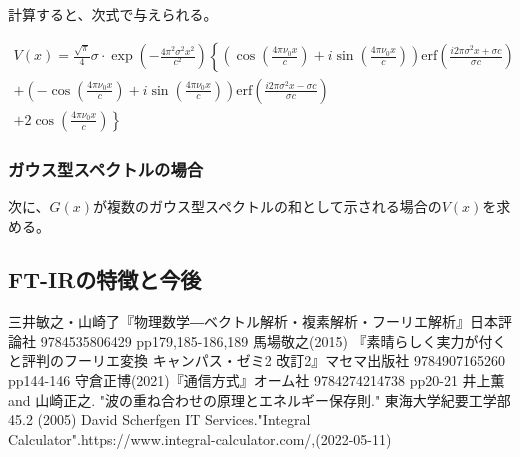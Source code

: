 \documentclass[uplatex, titlepage, fontsize=10pt, paper=a4paper]{jsarticle}
\numberwithin{equation}{section}
\begin{document}
計算すると、次式で与えられる。

\begin{multline}
    V(x)=\frac{\sqrt{\pi}}{4}\sigma \cdot \exp\left(-\frac{4{\pi^2}{\sigma^2}x^2}{c^2}\right)\left\{\left(\cos \left(\frac{4{\pi}{\nu_0}x}{c}\right)+i\sin \left(\frac{4{\pi}{\nu_0}x}{c}\right)\right)\mathrm{erf}\left(\frac{i2{\pi}{\sigma^2}x+{\sigma}c}{{\sigma}c}\right)\right. \\
    +\left(-\cos \left(\frac{4{\pi}{\nu_0}x}{c}\right)+i\sin \left(\frac{4{\pi}{\nu_0}x}{c}\right)\right)\mathrm{erf}\left(\frac{i2{\pi}{\sigma^2}x-{\sigma}c}{{\sigma}c}\right) \\
    +\left.2\cos\left(\frac{4{\pi}{\nu_0}x}{c}\right)\right\}
\end{multline}

\subsubsection{ガウス型スペクトルの場合}
次に、$G(x)$が複数のガウス型スペクトルの和として示される場合の$V(x)$を求める。

\subsection{FT-IRの特徴と今後}

\begin{thebibliography}{99}
    三井敏之・山崎了『物理数学―ベクトル解析・複素解析・フーリエ解析』日本評論社 9784535806429 pp179,185-186,189
    馬場敬之(2015) 『素晴らしく実力が付くと評判のフーリエ変換 キャンパス・ゼミ2 改訂2』マセマ出版社 9784907165260 pp144-146
    守倉正博(2021)『通信方式』オーム社 9784274214738 pp20-21
    井上薫 and 山崎正之. "波の重ね合わせの原理とエネルギー保存則." 東海大学紀要工学部 45.2 (2005)
    David Scherfgen IT Services."Integral Calculator".https://www.integral-calculator.com/,(2022-05-11)
\end{thebibliography}
\end{document}
